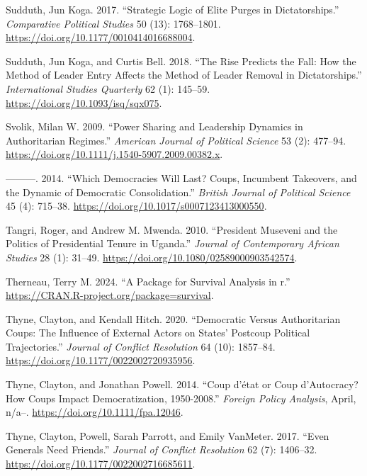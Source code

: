 \documentclass[
  12pt,
]{report}
\newlength{\cslhangindent}
\newenvironment{CSLReferences}[2] %
 {\begin{list}{}{%
  \setlength{\itemindent}{0pt}
  \setlength{\leftmargin}{0pt}
  \setlength{\parsep}{0pt}
  \ifodd #1
   \setlength{\leftmargin}{\cslhangindent}
   \setlength{\itemindent}{-1\cslhangindent}
  \fi
  \setlength{\itemsep}{#2\baselineskip}}}
 {\end{list}}
\begin{document}
\begin{CSLReferences}{1}{0}
Sudduth, Jun Koga. 2017. {``Strategic Logic of Elite Purges in
Dictatorships.''} \emph{Comparative Political Studies} 50 (13):
1768--1801. \url{https://doi.org/10.1177/0010414016688004}.

Sudduth, Jun Koga, and Curtis Bell. 2018. {``The Rise Predicts the Fall:
How the Method of Leader Entry Affects the Method of Leader Removal in
Dictatorships.''} \emph{International Studies Quarterly} 62 (1):
145--59. \url{https://doi.org/10.1093/isq/sqx075}.

Svolik, Milan W. 2009. {``Power Sharing and Leadership Dynamics in
Authoritarian Regimes.''} \emph{American Journal of Political Science}
53 (2): 477--94. \url{https://doi.org/10.1111/j.1540-5907.2009.00382.x}.

---------. 2014. {``Which Democracies Will Last? Coups, Incumbent
Takeovers, and the Dynamic of Democratic Consolidation.''} \emph{British
Journal of Political Science} 45 (4): 715--38.
\url{https://doi.org/10.1017/s0007123413000550}.

Tangri, Roger, and Andrew M. Mwenda. 2010. {``President Museveni and the
Politics of Presidential Tenure in Uganda.''} \emph{Journal of
Contemporary African Studies} 28 (1): 31--49.
\url{https://doi.org/10.1080/02589000903542574}.

Therneau, Terry M. 2024. {``A Package for Survival Analysis in r.''}
\url{https://CRAN.R-project.org/package=survival}.

Thyne, Clayton, and Kendall Hitch. 2020. {``Democratic Versus
Authoritarian Coups: The Influence of External Actors on States{'}
Postcoup Political Trajectories.''} \emph{Journal of Conflict
Resolution} 64 (10): 1857--84.
\url{https://doi.org/10.1177/0022002720935956}.

Thyne, Clayton, and Jonathan Powell. 2014. {``Coup d{'}état or Coup
d'Autocracy? How Coups Impact Democratization, 1950-2008.''}
\emph{Foreign Policy Analysis}, April, n/a--.
\url{https://doi.org/10.1111/fpa.12046}.

Thyne, Clayton, Powell, Sarah Parrott, and Emily VanMeter. 2017. {``Even
Generals Need Friends.''} \emph{Journal of Conflict Resolution} 62 (7):
1406--32. \url{https://doi.org/10.1177/0022002716685611}.


\end{CSLReferences}
\end{document}

